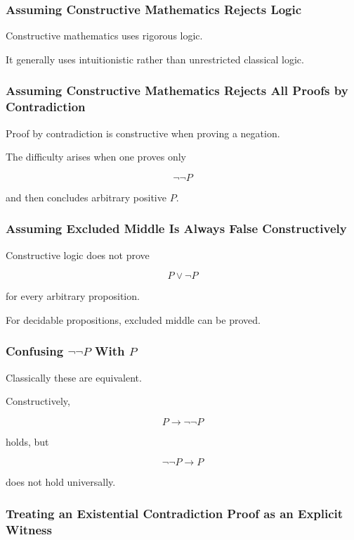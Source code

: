 \subsubsection{Assuming Constructive Mathematics Rejects Logic}

Constructive mathematics uses rigorous logic.

It generally uses intuitionistic rather than unrestricted classical logic.

\subsubsection{Assuming Constructive Mathematics Rejects All Proofs by Contradiction}

Proof by contradiction is constructive when proving a negation.

The difficulty arises when one proves only

\[
\neg\neg P
\]

and then concludes arbitrary positive \(P\).

\subsubsection{Assuming Excluded Middle Is Always False Constructively}

Constructive logic does not prove

\[
P\lor\neg P
\]

for every arbitrary proposition.

For decidable propositions, excluded middle can be proved.

\subsubsection{Confusing \(\neg\neg P\) With \(P\)}

Classically these are equivalent.

Constructively,

\[
\boxed{
P\rightarrow\neg\neg P
}
\]

holds, but

\[
\boxed{
\neg\neg P\rightarrow P
}
\]

does not hold universally.

\subsubsection{Treating an Existential Contradiction Proof as an Explicit Witness}

